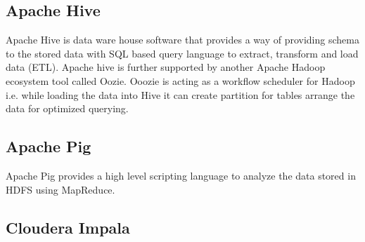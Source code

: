 \subsection{Apache Hive}
Apache Hive \cite{hive} is data ware house software that provides a way of providing schema to the stored data with SQL based query language to extract, transform and load data (ETL). Apache hive is further supported by another Apache Hadoop ecosystem tool called Oozie. Ooozie is acting as a workflow scheduler for Hadoop i.e. while loading the data into Hive it can create partition for tables arrange the data for optimized querying.
\subsection{Apache Pig}
Apache Pig \cite{pig}  provides a high level scripting language to analyze the data stored in HDFS using MapReduce. 
\subsection{Cloudera Impala}
